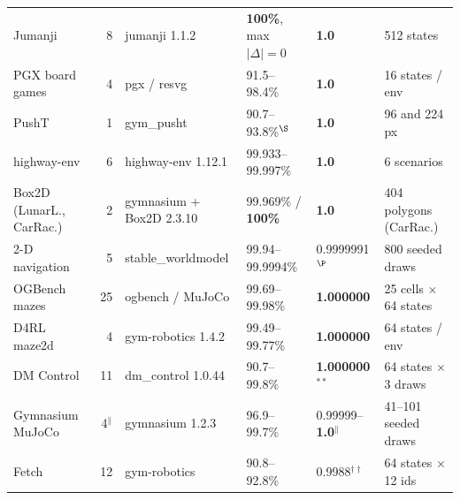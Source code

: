 \documentclass{article}
\begin{document}
\begin{table}[t]
\begin{tabular}{lrllll}
Jumanji              & 8  & jumanji 1.1.2            & \textbf{100\%}, max $|\Delta| = 0$ & \textbf{1.0} & 512 states \\
PGX board games      & 4  & pgx / resvg              & 91.5--98.4\% & \textbf{1.0} & 16 states / env \\
PushT                & 1  & gym\_pusht               & 90.7--93.8\%$^{\S}$ & \textbf{1.0} & 96 and 224\,px \\
highway-env          & 6  & highway-env 1.12.1       & 99.933--99.997\% & \textbf{1.0} & 6 scenarios \\
Box2D (LunarL., CarRac.) & 2 & gymnasium + Box2D 2.3.10 & 99.969\% / \textbf{100\%} & \textbf{1.0} & 404 polygons (CarRac.) \\
2-D navigation       & 5  & stable\_worldmodel       & 99.94--99.9994\% & 0.9999991$^{\P}$ & 800 seeded draws \\
OGBench mazes        & 25 & ogbench / MuJoCo         & 99.69--99.98\% & \textbf{1.000000} & 25 cells $\times$ 64 states \\
D4RL maze2d          & 4  & gym-robotics 1.4.2       & 99.49--99.77\% & \textbf{1.000000} & 64 states / env \\
DM Control           & 11 & dm\_control 1.0.44       & 90.7--99.8\% & \textbf{1.000000}$^{**}$ & 64 states $\times$ 3 draws \\
Gymnasium MuJoCo     & 4$^{\|}$ & gymnasium 1.2.3    & 96.9--99.7\% & 0.99999--\textbf{1.0}$^{\|}$ & 41--101 seeded draws \\
Fetch                & 12 & gym-robotics             & 90.8--92.8\% & 0.9988$^{\dagger\dagger}$ & 64 states $\times$ 12 ids \\

\end{tabular}
\end{table}
\end{document}
